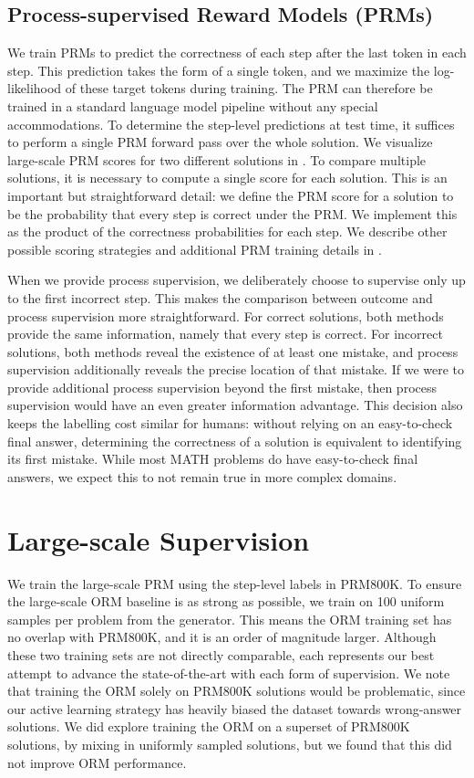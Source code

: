 \documentclass{article}
\begin{document}
\subsection{Process-supervised Reward Models (PRMs)}

We train PRMs to predict the correctness of each step after the last token in each step. This prediction takes the form of a single token, and we maximize the log-likelihood of these target tokens during training. The PRM can therefore be trained in a standard language model pipeline without any special accommodations. To determine the step-level predictions at test time, it suffices to perform a single PRM forward pass over the whole solution. We visualize large-scale PRM scores for two different solutions in . To compare multiple solutions, it is necessary to compute a single score for each solution. This is an important but straightforward detail: we define the PRM score for a solution to be the probability that every step is correct under the PRM. We implement this as the product of the correctness probabilities for each step. We describe other possible scoring strategies and additional PRM training details in .

When we provide process supervision, we deliberately choose to supervise only up to the first incorrect step. This makes the comparison between outcome and process supervision more straightforward. For correct solutions, both methods provide the same information, namely that every step is correct. For incorrect solutions, both methods reveal the existence of at least one mistake, and process supervision additionally reveals the precise location of that mistake. If we were to provide additional process supervision beyond the first mistake, then process supervision would have an even greater information advantage. This decision also keeps the labelling cost similar for humans: without relying on an easy-to-check final answer, determining the correctness of a solution is equivalent to identifying its first mistake. While most MATH problems do have easy-to-check final answers, we expect this to not remain true in more complex domains.

\section{Large-scale Supervision}
\label{section:large_scale}

We train the large-scale PRM using the step-level labels in PRM800K. To ensure the large-scale ORM baseline is as strong as possible, we train on 100 uniform samples per problem from the generator. This means the ORM training set has no overlap with PRM800K, and it is an order of magnitude larger. Although these two training sets are not directly comparable, each represents our best attempt to advance the state-of-the-art with each form of supervision. We note that training the ORM solely on PRM800K solutions would be problematic, since our active learning strategy has heavily biased the dataset towards wrong-answer solutions. We did explore training the ORM on a superset of PRM800K solutions, by mixing in uniformly sampled solutions, but we found that this did not improve ORM performance.
\end{document}
